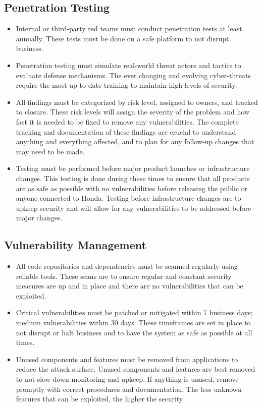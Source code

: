 \subsection{Penetration Testing}
\begin{itemize}
    \item Internal or third-party red teams must conduct penetration tests at least annually. These tests must be done on a safe platform to not disrupt business. 
    \item Penetration testing must simulate real-world threat actors and tactics to evaluate defense mechanisms. The ever changing and evolving cyber-threats require the most up to date training to maintain high levels of security.
    \item All findings must be categorized by risk level, assigned to owners, and tracked to closure. These risk levels will assign the severity of the problem and how fast it is needed to be fixed to remove any vulnerabilities. The complete tracking and documentation of these findings are crucial to understand anything and everything affected, and to plan for any follow-up changes that may need to be made.
    \item Testing must be performed before major product launches or infrastructure changes. This testing is done during these times to ensure that all products are as safe as possible with no vulnerabilities before releasing the public or anyone connected to Honda. Testing before infrastructure changes are to upkeep security and will allow for any vulnerabilities to be addressed before major changes. 
\end{itemize}
\subsection{Vulnerability Management}
\begin{itemize}
    \item All code repositories and dependencies must be scanned regularly using reliable tools. These scans are to ensure regular and constant security measures are up and in place and there are no vulnerabilities that can be exploited. 
    \item Critical vulnerabilities must be patched or mitigated within 7 business days; medium vulnerabilities within 30 days. These timeframes are set in place to not disrupt or halt business and to have the system as safe as possible at all times.
    \item Unused components and features must be removed from applications to reduce the attack surface. Unused components and features are best removed to not slow down monitoring and upkeep. If anything is unused, remove promptly with correct procedures and documentation. The less unknown features that can be exploited, the higher the security
\end{itemize}
